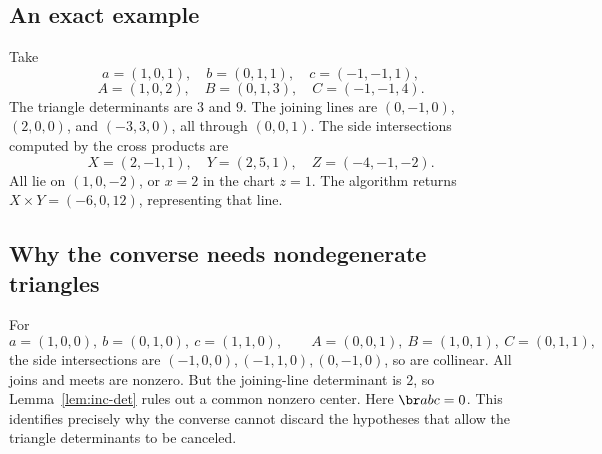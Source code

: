 \subsection{An exact example}
Take
\[
 a=(1,0,1),\quad b=(0,1,1),\quad c=(-1,-1,1),
\]
\[
 A=(1,0,2),\quad B=(0,1,3),\quad C=(-1,-1,4).
\]
The triangle determinants are $3$ and $9$. The joining lines are
$(0,-1,0)$, $(2,0,0)$, and $(-3,3,0)$, all through $(0,0,1)$.
The side intersections computed by the cross products are
\[
 X=(2,-1,1),\quad Y=(2,5,1),\quad Z=(-4,-1,-2).
\]
All lie on $(1,0,-2)$, or $x=2$ in the chart $z=1$.
The algorithm returns $X\times Y=(-6,0,12)$, representing that line.

\subsection{Why the converse needs nondegenerate triangles}
For
\[
 a=(1,0,0),\ b=(0,1,0),\ c=(1,1,0),\qquad
 A=(0,0,1),\ B=(1,0,1),\ C=(0,1,1),
\]
the side intersections are $(-1,0,0),(-1,1,0),(0,-1,0)$,
so are collinear. All joins and meets are nonzero. But the
joining-line determinant is $2$, so Lemma~\ref{lem:inc-det}
rules out a common nonzero center. Here $\br a b c=0$.
This identifies precisely why the converse cannot discard the
hypotheses that allow the triangle determinants to be canceled.


